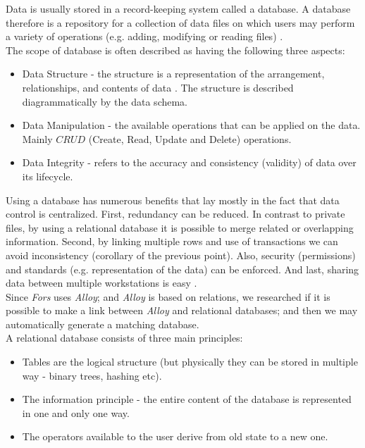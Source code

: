 \documentclass[oneside]{book}
\begin{document}
Data is usually stored in a record-keeping system called a database. A database therefore is a repository for a collection of data files on which users may perform a variety of operations (e.g. adding, modifying or reading files)  \cite[p.~11]{introtodb}.\\

The scope of database is often described as having the following three aspects:
\begin{itemize}
  \item Data Structure - the structure is a representation of the arrangement, relationships, and contents of data \cite{datastruct}. The structure is described diagrammatically by the data schema.  
  \item Data Manipulation - the available operations that can be applied on the data. Mainly $CRUD$ (Create, Read, Update and Delete) operations.
  \item Data Integrity - refers to the accuracy and consistency (validity) of data over its lifecycle.
\end{itemize}

Using a database has numerous benefits that lay mostly in the fact that data control is centralized. First, redundancy can be reduced. In contrast to private files, by using a relational database it is possible to merge related or overlapping information. Second, by linking multiple rows and use of transactions we can avoid inconsistency (corollary of the previous point). Also, security (permissions) and standards (e.g. representation of the data) can be enforced. And last, sharing data between multiple workstations is easy \cite[p.~16]{introtodb}.\\

Since \textit{Fors} uses \textit{Alloy}; and \textit{Alloy} is based on relations, we researched if it is possible to make a link between \textit{Alloy} and relational databases; and then we may automatically generate a matching database.\\

A relational database consists of three main principles:
\begin{itemize}
	\item Tables are the logical structure (but physically they can be stored in multiple way - binary trees, hashing etc). 
	\item The information principle - the entire content of the database is represented in one and only one way.
	\item The operators available to the user derive from old state to a new one.
\end{itemize}
\end{document}
